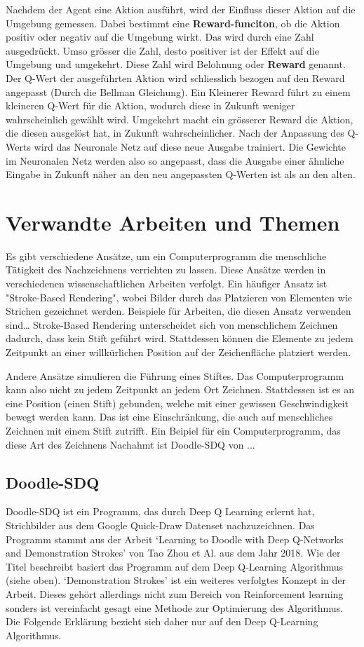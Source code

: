 Nachdem der Agent eine Aktion ausführt, wird der Einfluss dieser Aktion auf die
Umgebung gemessen. Dabei bestimmt eine \textbf{Reward-funciton}, ob die Aktion
positiv oder negativ auf die Umgebung wirkt. Das wird durch eine Zahl
ausgedrückt. Umso grösser die Zahl, desto positiver ist der Effekt auf die
Umgebung und umgekehrt. Diese Zahl wird Belohnung oder \textbf{Reward} genannt.
Der Q-Wert der ausgeführten Aktion wird schliesslich bezogen auf den Reward
angepasst (Durch die Bellman Gleichung). Ein Kleinerer Reward führt zu einem
kleineren Q-Wert für die Aktion, wodurch diese in Zukunft weniger wahrscheinlich
gewählt wird. Umgekehrt macht ein grösserer Reward die Aktion, die diesen
ausgelöst hat, in Zukunft wahrscheinlicher. Nach der Anpassung des Q-Werts wird
das Neuronale Netz auf diese neue Ausgabe trainiert. Die Gewichte im Neuronalen
Netz werden also so angepasst, dass die Ausgabe einer ähnliche Eingabe in
Zukunft näher an den neu angepassten Q-Werten ist als an den alten.

\section{Verwandte Arbeiten und Themen}
\label{chap:t_verwandt}
Es gibt verschiedene Ansätze, um ein Computerprogramm die menschliche Tätigkeit
des Nachzeichnens verrichten zu lassen. Diese Ansätze werden in verschiedenen
wissenschaftlichen Arbeiten verfolgt. Ein häufiger Ansatz ist "Stroke-Based
Rendering", wobei Bilder durch das Platzieren von Elementen wie Strichen
gezeichnet werden. Beispiele für Arbeiten, die diesen Ansatz verwenden sind\dots
Stroke-Based Rendering unterscheidet sich von menschlichem Zeichnen dadurch,
dass kein Stift geführt wird. Stattdessen können die Elemente zu jedem Zeitpunkt
an einer willkürlichen Position auf der Zeichenfläche platziert werden.

Andere Ansätze simulieren die Führung eines Stiftes. Das Computerprogramm kann
also nicht zu jedem Zeitpunkt an jedem Ort Zeichnen. Stattdessen ist es an eine
Position (einen Stift) gebunden, welche mit einer gewissen Geschwindigkeit
bewegt werden kann. Das ist eine Einschränkung, die auch auf menschliches
Zeichnen mit einem Stift zutrifft. Ein Beipiel für ein Computerprogramm, das
diese Art des Zeichnens Nachahmt ist Doodle-SDQ von ...


\subsection*{Doodle-SDQ}
Doodle-SDQ ist ein Programm, das durch Deep Q Learning erlernt hat, Strichbilder
aus dem Google Quick-Draw Datenset nachzuzeichnen. Das Programm stammt aus der
Arbeit `Learning to Doodle with Deep Q-Networks and Demonstration Strokes' von
Tao Zhou et Al. aus dem Jahr 2018. Wie der Titel beschreibt basiert das Programm
auf dem Deep Q-Learning Algorithmus (siehe oben). `Demonstration Strokes' ist
ein weiteres verfolgtes Konzept in der Arbeit. Dieses gehört allerdings nicht
zum Bereich von Reinforcement learning sonders ist vereinfacht gesagt eine
Methode zur Optimierung des Algorithmus. Die Folgende Erklärung bezieht sich
daher nur auf den Deep Q-Learning Algorithmus.


